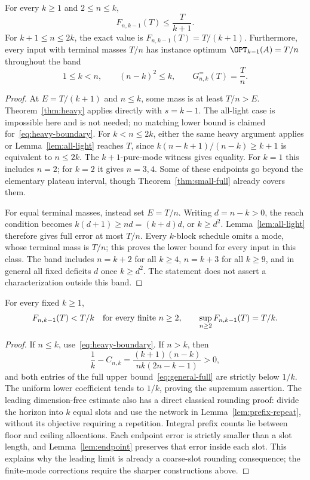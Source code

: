 \begin{corollary}
\label{cor:light-boundaries}
For every $k\ge1$ and $2\le n\le k$,
\begin{equation}\label{eq:heavy-boundary}
 F_{n,k-1}(T)\le\frac{T}{k+1}.
\end{equation}
For $k+1\le n\le2k$, the exact value is $F_{n,k-1}(T)=T/(k+1)$.
Furthermore, every input with terminal masses $T/n$ has instance optimum
$\OPT_{k-1}(A)=T/n$ throughout the band
\begin{equation}\label{eq:equal-mass-band}
 1\le k<n,\qquad (n-k)^2\le k,
 \qquad G^=_{n,k}(T)=\frac Tn.
\end{equation}
\end{corollary}
\begin{proof}
At $E=T/(k+1)$ and $n\le k$, some mass is at least
$T/n>E$. Theorem~\ref{thm:heavy} applies directly with $s=k-1$.
The all-light case is impossible here and is not needed; no matching
lower bound is claimed for~\eqref{eq:heavy-boundary}.
For $k<n\le2k$, either the same heavy argument applies or
Lemma~\ref{lem:all-light} reaches $T$, since
$k(n-k+1)/(n-k)\ge k+1$ is equivalent to $n\le2k$.
The $k+1$-pure-mode witness gives equality. For $k=1$ this includes
$n=2$; for $k=2$ it gives $n=3,4$. Some of these endpoints go beyond
the elementary plateau interval, though Theorem~\ref{thm:small-full}
already covers them.

For equal terminal masses, instead set $E=T/n$. Writing $d=n-k>0$,
the reach condition becomes $k(d+1)\ge nd=(k+d)d$, or $k\ge d^2$.
Lemma~\ref{lem:all-light} therefore gives full error at most $T/n$.
Every $k$-block schedule omits a mode, whose terminal mass is $T/n$;
this proves the lower bound for every input in this class. The band
includes $n=k+2$ for all $k\ge4$, $n=k+3$ for all $k\ge9$, and in
general all fixed deficits $d$ once $k\ge d^2$. The statement does
not assert a characterization outside this band.
\end{proof}

\begin{proposition}\label{prop:dimension-free}
For every fixed $k\ge1$,
\[
 F_{n,k-1}(T)<T/k\quad\hbox{for every finite }n\ge2,
 \qquad \sup_{n\ge2}F_{n,k-1}(T)=T/k.
\]
\end{proposition}
\begin{proof}
If $n\le k$, use~\eqref{eq:heavy-boundary}. If $n>k$, then
\[
 \frac1k-C_{n,k}
 =\frac{(k+1)(n-k)}{nk(2n-k-1)}>0,
\]
and both entries of the full upper bound~\eqref{eq:general-full} are
strictly below $1/k$. The uniform lower coefficient tends to $1/k$,
proving the supremum assertion. The leading dimension-free estimate also
has a direct classical rounding proof: divide the horizon into $k$ equal
slots and use the network in Lemma~\ref{lem:prefix-repeat}, without its
objective requiring a repetition. Integral prefix counts lie between
floor and ceiling allocations. Each endpoint error is strictly smaller
than a slot length, and Lemma~\ref{lem:endpoint} preserves that error
inside each slot. This explains why the leading limit is already a
coarse-slot rounding consequence; the finite-mode corrections require
the sharper constructions above.
\end{proof}

